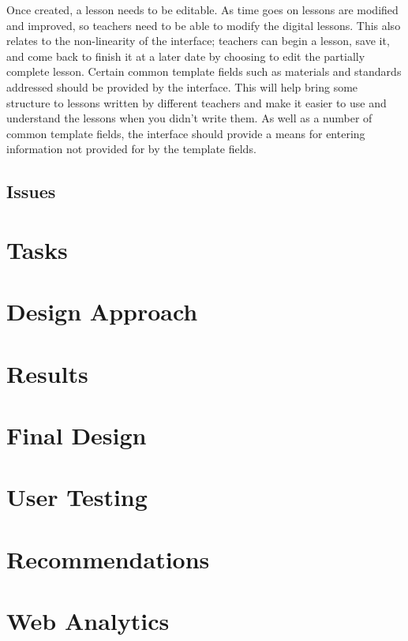 \documentclass[10pt,letter]{article}
\begin{document}
Once created, a lesson needs to be editable. As time goes on lessons are
modified and improved, so teachers need to be able to modify the digital
lessons. This also relates to the non-linearity of the interface; teachers can
begin a lesson, save it, and come back to finish it at a later date by choosing
to edit the partially complete lesson. Certain common template fields such as
materials and standards addressed should be provided by the interface. This will
help bring some structure to lessons written by different teachers and make it
easier to use and understand the lessons when you didn't write them. As well as
a number of common template fields, the interface should provide a means for
entering information not provided for by the template fields.

\subsection{Issues}

\section{Tasks}

\section{Design Approach}

\section{Results}

\section{Final Design}

\section{User Testing}

\section{Recommendations}

\section{Web Analytics}

\pagebreak
\appendix
\end{document}
